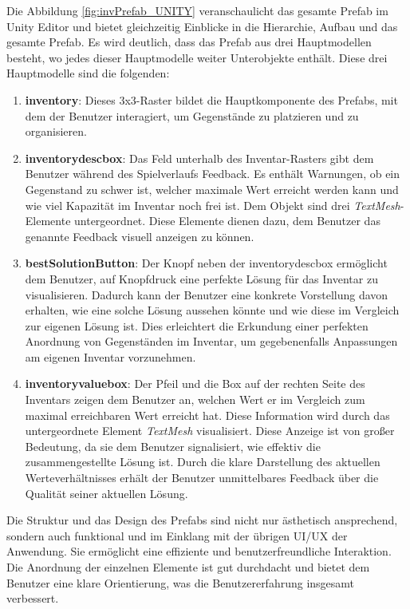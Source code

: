 Die Abbildung \ref{fig:invPrefab_UNITY} veranschaulicht das gesamte Prefab im Unity Editor und bietet gleichzeitig Einblicke
in die Hierarchie, Aufbau und das gesamte Prefab. Es wird deutlich, dass das Prefab aus drei Hauptmodellen besteht, wo
jedes dieser Hauptmodelle weiter Unterobjekte enthält. Diese drei Hauptmodelle sind die folgenden:
\begin{enumerate}
    \item \textbf{inventory}: Dieses 3x3-Raster bildet die Hauptkomponente des Prefabs, mit dem der Benutzer interagiert,
    um Gegenstände zu platzieren und zu organisieren.

    \item \textbf{inventorydescbox}: Das Feld unterhalb des Inventar-Rasters gibt dem Benutzer während des Spielverlaufs
    Feedback. Es enthält Warnungen, ob ein Gegenstand zu schwer ist, welcher maximale Wert erreicht werden kann und wie
    viel Kapazität im Inventar noch frei ist. Dem Objekt sind drei \textit{TextMesh}-Elemente untergeordnet. Diese Elemente
    dienen dazu, dem Benutzer das genannte Feedback visuell anzeigen zu können.

    \item \textbf{bestSolutionButton}: Der Knopf neben der inventorydescbox ermöglicht dem Benutzer, auf Knopfdruck eine
    perfekte Lösung für das Inventar zu visualisieren. Dadurch kann der Benutzer eine konkrete Vorstellung davon erhalten,
    wie eine solche Lösung aussehen könnte und wie diese im Vergleich zur eigenen Lösung ist. Dies erleichtert die Erkundung
    einer perfekten Anordnung von Gegenständen im Inventar, um gegebenenfalls Anpassungen am eigenen Inventar vorzunehmen.

    \item \textbf{inventoryvaluebox}: Der Pfeil und die Box auf der rechten Seite des Inventars zeigen dem Benutzer an,
    welchen Wert er im Vergleich zum maximal erreichbaren Wert erreicht hat. Diese Information wird durch das untergeordnete
    Element \textit{TextMesh} visualisiert. Diese Anzeige ist von großer Bedeutung, da sie dem Benutzer signalisiert, wie
    effektiv die zusammengestellte Lösung ist. Durch die klare Darstellung des aktuellen Werteverhältnisses erhält der
    Benutzer unmittelbares Feedback über die Qualität seiner aktuellen Lösung.
\end{enumerate}

Die Struktur und das Design des Prefabs sind nicht nur ästhetisch ansprechend, sondern auch funktional und im Einklang
mit der übrigen UI/UX der Anwendung. Sie ermöglicht eine effiziente und benutzerfreundliche Interaktion. Die Anordnung
der einzelnen Elemente ist gut durchdacht und bietet dem Benutzer eine klare Orientierung, was die Benutzererfahrung
insgesamt verbessert.

